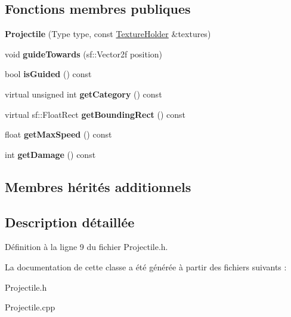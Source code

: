 \subsection*{Fonctions membres publiques}
\begin{DoxyCompactItemize}
\item 
\hypertarget{class_projectile_a3cc3cae5a10d2ba896788e48d2decca8}{}\label{class_projectile_a3cc3cae5a10d2ba896788e48d2decca8} 
{\bfseries Projectile} (Type type, const \hyperlink{class_resource_holder}{Texture\+Holder} \&textures)
\item 
\hypertarget{class_projectile_a00dad6aba348a7c0c5cf006dee7f98b2}{}\label{class_projectile_a00dad6aba348a7c0c5cf006dee7f98b2} 
void {\bfseries guide\+Towards} (sf\+::\+Vector2f position)
\item 
\hypertarget{class_projectile_af72470e40dde23c80ab7b3b739d4023d}{}\label{class_projectile_af72470e40dde23c80ab7b3b739d4023d} 
bool {\bfseries is\+Guided} () const
\item 
\hypertarget{class_projectile_a434138083867a7a499192ebdafc97441}{}\label{class_projectile_a434138083867a7a499192ebdafc97441} 
virtual unsigned int {\bfseries get\+Category} () const
\item 
\hypertarget{class_projectile_a7f17ca6a688522892fd543229a047a03}{}\label{class_projectile_a7f17ca6a688522892fd543229a047a03} 
virtual sf\+::\+Float\+Rect {\bfseries get\+Bounding\+Rect} () const
\item 
\hypertarget{class_projectile_a2e15585a30093e0cd03c5ecbf14e4f1f}{}\label{class_projectile_a2e15585a30093e0cd03c5ecbf14e4f1f} 
float {\bfseries get\+Max\+Speed} () const
\item 
\hypertarget{class_projectile_af5cd30772ad4cb3894629ca76c6b8f79}{}\label{class_projectile_af5cd30772ad4cb3894629ca76c6b8f79} 
int {\bfseries get\+Damage} () const
\end{DoxyCompactItemize}
\subsection*{Membres hérités additionnels}


\subsection{Description détaillée}


Définition à la ligne 9 du fichier Projectile.\+h.



La documentation de cette classe a été générée à partir des fichiers suivants \+:\begin{DoxyCompactItemize}
\item 
Projectile.\+h\item 
Projectile.\+cpp\end{DoxyCompactItemize}
